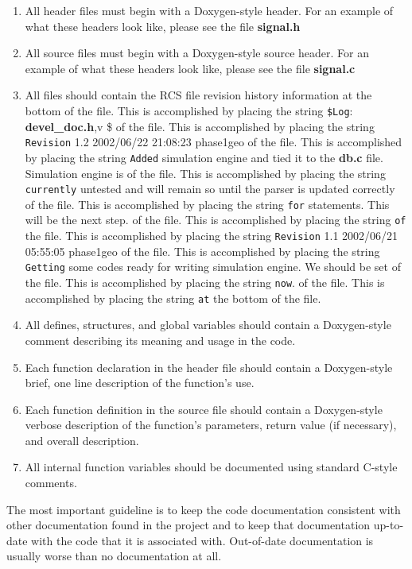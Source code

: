 \begin{Desc}
\begin{enumerate}
\item 
All header files must begin with a Doxygen-style header. For an example of what these  headers look like, please see the file {\bf signal.h}\item 
All source files must begin with a Doxygen-style source header. For an example of what these headers look like, please see the file {\bf signal.c}\item 
All files should contain the RCS file revision history information at the bottom of the file. This is accomplished by placing the string {\tt \$Log}: {\bf devel\_\-doc.h},v \$ of the file. This is accomplished by placing the string {\tt Revision} 1.2 2002/06/22 21:08:23 phase1geo of the file. This is accomplished by placing the string {\tt Added} simulation engine and tied it to the {\bf db.c} file. Simulation engine is of the file. This is accomplished by placing the string {\tt currently} untested and will remain so until the parser is updated correctly of the file. This is accomplished by placing the string {\tt for} statements. This will be the next step. of the file. This is accomplished by placing the string {\tt of} the file. This is accomplished by placing the string {\tt Revision} 1.1 2002/06/21 05:55:05 phase1geo of the file. This is accomplished by placing the string {\tt Getting} some codes ready for writing simulation engine. We should be set of the file. This is accomplished by placing the string {\tt now}. of the file. This is accomplished by placing the string {\tt at} the bottom of the file.\item 
All defines, structures, and global variables should contain a Doxygen-style comment  describing its meaning and usage in the code.\item 
Each function declaration in the header file should contain a Doxygen-style brief, one line description of the function's use.\item 
Each function definition in the source file should contain a Doxygen-style verbose description of the function's parameters, return value (if necessary), and overall description.\item 
All internal function variables should be documented using standard C-style comments.\end{enumerate}
\end{Desc}


 The most important guideline is to keep the code documentation consistent with other documentation found in the project and to keep that documentation up-to-date with the code that it is associated with. Out-of-date documentation is usually worse than no documentation at all.



